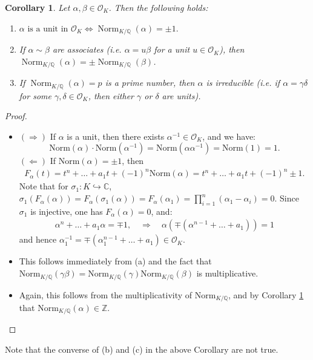 \documentclass[11pt]{book}
\newtheorem{corollary}[theorem]{Corollary}
\begin{document}
\begin{corollary} \label{cor-normz}
    Let $\alpha, \beta \in \mathcal{O}_K$. Then the following holds:
    \begin{enumerate}
        \item[(a)] $\alpha\text{ is a unit in } \mathcal{O}_K \Leftrightarrow \operatorname{Norm}_{K/\mathbb{Q}}(\alpha)=\pm 1.$
        \item[(b)] If $\alpha \sim \beta$ are associates (i.e. $\alpha = u\beta$ for a unit $u \in \mathcal{O}_K$), then $\operatorname{Norm}_{K/\mathbb{Q}}(\alpha)= \pm \operatorname{Norm}_{K/\mathbb{Q}}(\beta)$.
        \item[(c)] If $\operatorname{Norm}_{K/\mathbb{Q}}(\alpha) = p$ is a prime number, then $\alpha$ is irreducible (i.e. if $\alpha = \gamma \delta$ for some $\gamma, \delta \in \mathcal{O}_K$, then either $\gamma$ or $\delta$ are units).
    \end{enumerate}
\end{corollary}
\begin{proof}
\begin{itemize} 
    \item[(a)] $(\Rightarrow)$ If $\alpha$ is a unit, then there exists $\alpha^{-1} \in \mathcal{O}_K$, and we have:
$$\mathrm{Norm}(\alpha) \cdot \mathrm{Norm}(\alpha^{-1}) = \mathrm{Norm}(\alpha \alpha^{-1}) = \mathrm{Norm}(1) = 1.$$
$(\Leftarrow)$ If $\mathrm{Norm}(\alpha) = \pm 1$, then 
\begin{align*}
F_\alpha(t) = t^n + \dots + a_1 t + (-1)^n \mathrm{Norm}(\alpha)
= t^n + \dots + a_1 t + (-1)^n \pm 1.
\end{align*}
Note that for $\sigma_1: K \hookrightarrow \mathbb{C}$,
$\sigma_1(F_{\alpha}(\alpha)) = F_{\alpha}(\sigma_1(\alpha)) = F_{\alpha}(\alpha_1) = \prod_{i=1}^n(\alpha_1 - \alpha_i) = 0$. Since $\sigma_1$ is injective, one has $F_{\alpha}(\alpha) = 0$, and:
\begin{align*}
\alpha^n + \dots + a_1 \alpha = \mp 1, \quad \Rightarrow \quad \alpha \left( \mp (\alpha^{n-1} + \dots + a_1) \right) = 1
\end{align*}
and hence $\alpha_1^{-1} = \mp (\alpha_1^{n-1} + \dots + a_1) \in \mathcal{O}_K$.    
\item[(b)] This follows immediately from (a) and the fact that $\mathrm{Norm}_{K/\mathbb{Q}}(\gamma \beta) = \mathrm{Norm}_{K/\mathbb{Q}}(\gamma) \mathrm{Norm}_{K/\mathbb{Q}}(\beta)$ is multiplicative.
\item[(c)] Again, this follows from the multiplicativity of $\mathrm{Norm}_{K/\mathbb{Q}}$, and by Corollary \ref{cor-normz} that $\mathrm{Norm}_{K/\mathbb{Q}}(\alpha) \in \mathbb{Z}$.
\end{itemize}
\end{proof}
Note that the converse of (b) and (c) in the above Corollary are not true.
\end{document}
